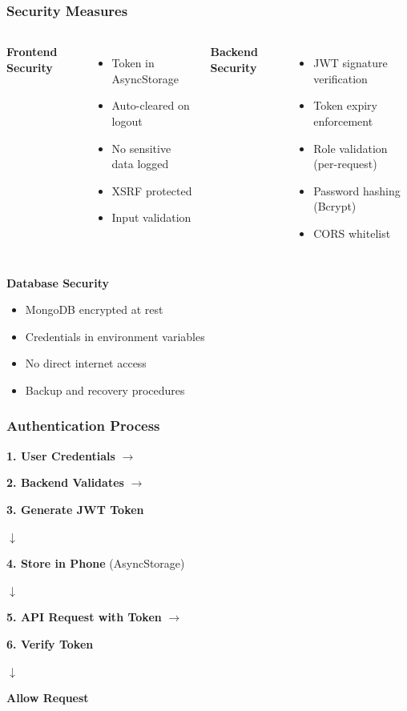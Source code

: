 \documentclass[11pt]{beamer}
\begin{document}
\begin{frame}
\frametitle{Security Measures}
\begin{columns}[T]
\textbf{Frontend Security}
\begin{itemize}
    \item Token in AsyncStorage
    \item Auto-cleared on logout
    \item No sensitive data logged
    \item XSRF protected
    \item Input validation
\end{itemize}

\textbf{Backend Security}
\begin{itemize}
    \item JWT signature verification
    \item Token expiry enforcement
    \item Role validation (per-request)
    \item Password hashing (Bcrypt)
    \item CORS whitelist
\end{itemize}
\end{columns}

\vspace{1cm}
\textbf{Database Security}
\begin{itemize}
    \item MongoDB encrypted at rest
    \item Credentials in environment variables
    \item No direct internet access
    \item Backup and recovery procedures
\end{itemize}
\end{frame}

\begin{frame}
\frametitle{Authentication Process}
\begin{center}

\textbf{1. User Credentials}
$\rightarrow$

\textbf{2. Backend Validates}
$\rightarrow$

\textbf{3. Generate JWT Token}

$\downarrow$

\textbf{4. Store in Phone} (AsyncStorage)

$\downarrow$

\textbf{5. API Request with Token}
$\rightarrow$

\textbf{6. Verify Token}

$\downarrow$

\textbf{Allow Request}

\end{center}
\end{frame}
\end{document}
